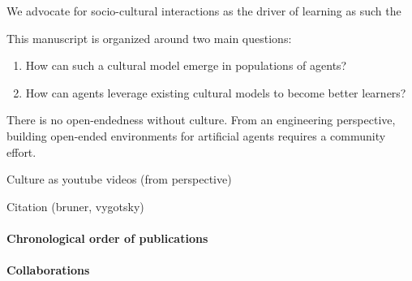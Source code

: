 We advocate for socio-cultural interactions as the driver of learning as such the 


This manuscript is organized around two main questions:
%
\begin{enumerate}[noitemsep]
	\item How can such a cultural model emerge in populations of agents?
	\item How can agents leverage existing cultural models to become better learners? 
\end{enumerate}

There is no open-endedness without culture. From an engineering perspective, building open-ended environments for artificial agents requires a community effort.

Culture as youtube videos (from perspective)

Citation (bruner, vygotsky)

\clearpage

\paragraph{Chronological order of publications}

\paragraph{Collaborations}



